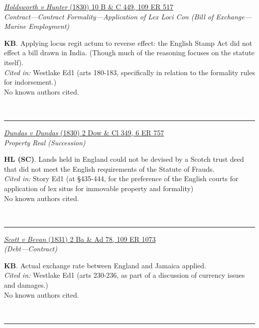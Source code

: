 \documentclass[twoside]{article}
\begin{document}
        \begin{small}
        \begin{center}
        \href{https://heinonline.org/HOL/P?h=hein.engrep/engrf0109&i=521}{\textit{Holdsworth v Hunter} (1830) 10 B \& C 449, 109 ER 517} \label{59} \\ 
\textit{Contract---Contract Formality---Application of Lex Loci Con (Bill of Exchange---Marine Employment)}\\
        \end{center}
        \textbf{KB}. Applying locus regit actum to reverse effect: the English Stamp Act did not effect a bill drawn in India. (Though much of the reasoning focuses on the statute itself).\\\textit{Cited in: }Westlake Ed1 (arts 180-183, specifically in relation to the formality rules for indorsement.)\\No known authors cited.
        \end{small}\\
        \rule{\textwidth}{0.5pt}
        

        \begin{small}
        \begin{center}
        \href{https://heinonline.org/HOL/P?h=hein.engrep/engra0006&i=769}{\textit{Dundas v Dundas} (1830) 2 Dow \& Cl 349, 6 ER 757} \label{134} \\ 
\textit{Property Real (Succession)}\\
        \end{center}
        \textbf{HL (SC)}. Lands held in England could not be devised by a Scotch trust deed that did not meet the English requirements of the Statute of Frauds.\\\textit{Cited in: }Story Ed1 (at §435-444, for the preference of the English courts for application of lex situs for immovable property and formality)\\No known authors cited.
        \end{small}\\
        \rule{\textwidth}{0.5pt}
        

        \begin{small}
        \begin{center}
        \href{https://heinonline.org/HOL/P?h=hein.engrep/engrf0109&i=1077}{\textit{Scott v Bevan} (1831) 2 Ba \& Ad 78, 109 ER 1073} \label{36} \\ 
\textit{ (Debt---Contract)}\\
        \end{center}
        \textbf{KB}. Actual exchange rate between England and Jamaica applied.\\\textit{Cited in: }Westlake Ed1 (arts 230-236, as part of a discussion of currency issues and damages.)\\No known authors cited.
        \end{small}\\
        \rule{\textwidth}{0.5pt}
        
\end{document}
